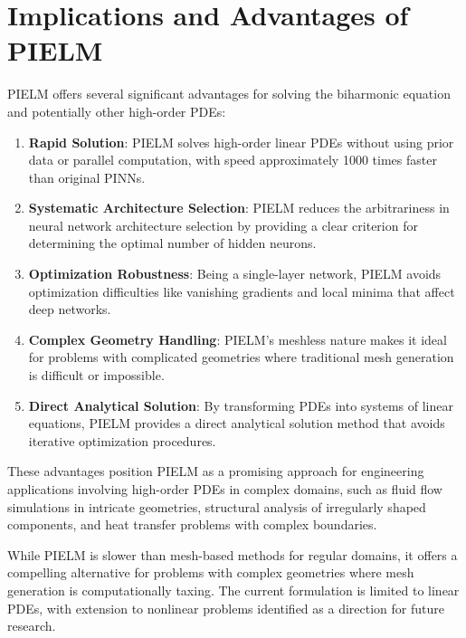 \documentclass[11pt]{article}
\begin{document}
\section{Implications and Advantages of PIELM}

PIELM offers several significant advantages for solving the biharmonic equation and potentially other high-order PDEs:

\begin{enumerate}
    \item \textbf{Rapid Solution}: PIELM solves high-order linear PDEs without using prior data or parallel computation, with speed approximately 1000 times faster than original PINNs.
    
    \item \textbf{Systematic Architecture Selection}: PIELM reduces the arbitrariness in neural network architecture selection by providing a clear criterion for determining the optimal number of hidden neurons.
    
    \item \textbf{Optimization Robustness}: Being a single-layer network, PIELM avoids optimization difficulties like vanishing gradients and local minima that affect deep networks.
    
    \item \textbf{Complex Geometry Handling}: PIELM's meshless nature makes it ideal for problems with complicated geometries where traditional mesh generation is difficult or impossible.
    
    \item \textbf{Direct Analytical Solution}: By transforming PDEs into systems of linear equations, PIELM provides a direct analytical solution method that avoids iterative optimization procedures.
\end{enumerate}

These advantages position PIELM as a promising approach for engineering applications involving high-order PDEs in complex domains, such as fluid flow simulations in intricate geometries, structural analysis of irregularly shaped components, and heat transfer problems with complex boundaries.

While PIELM is slower than mesh-based methods for regular domains, it offers a compelling alternative for problems with complex geometries where mesh generation is computationally taxing. The current formulation is limited to linear PDEs, with extension to nonlinear problems identified as a direction for future research.
\end{document}
